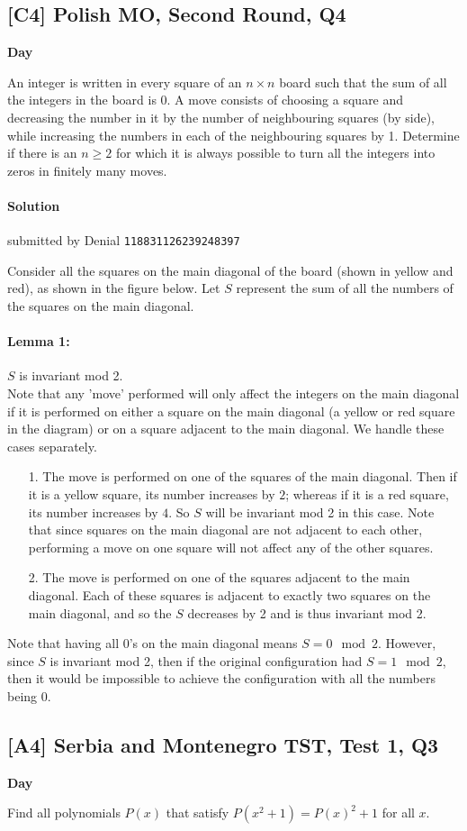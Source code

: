 \documentclass[10pt]{article}
\newcommand{\themonth}{March}
\newcommand{\theyear}{2019}
\newcounter{day}
\newcounter{solution}
\newcounter{datenumber}
\newcommand{\problem}[4][0]{
	\newpage
	\subsection{[#3] \space #2} \hfill 
	{\large\textbf{Day \arabic{day}}} %
	\begin{flushleft} #4 \end{flushleft}
	\vspace{1em}
	\addtocounter{day}{1}
	\addtocounter{datenumber}{1}
	\setcounter{solution}{1}
}
\newcommand{\solution}[4][0]{
	\paragraph{Solution \arabic{solution}} \hfill submitted by #2 \hfill \texttt{#3}
	\begin{flushleft} #4 \end{flushleft}
	\addtocounter{solution}{1}
	\vspace{1em}
}
\begin{document}
\problem[30]{2008 Polish MO, Second Round, Q4}{C4}{An integer is written in every square of an $n \times n$ board such that the sum of all the integers in the board is 0. A move consists of choosing a square and decreasing the number in it by the number of neighbouring squares (by side), while increasing the numbers in each of the neighbouring squares by 1. Determine if there is an $n \geq 2$ for which it is always possible to turn all the integers into zeros in finitely many moves.}

\solution[30]{Denial}{118831126239248397}{
Consider all the squares on the main diagonal of the board (shown in yellow and red), as shown in the figure below. Let $S$ represent the sum of all the numbers of the squares on the main diagonal. \\ 

\paragraph{Lemma 1: }$S$ is invariant mod 2. \\
Note that any 'move' performed will only affect the integers on the main diagonal if it is performed on either a square on the main diagonal (a yellow or red square in the diagram) or on a square adjacent to the main diagonal. We handle these cases separately. 
\begin{enumerate}
	\item[1. ]The move is performed on one of the squares of the main diagonal. Then if it is a yellow square, its number increases by $2$; whereas if it is a red square, its number increases by $4$. So $S$ will be invariant mod 2 in this case. Note that since squares on the main diagonal are not adjacent to each other, performing a move on one square will not affect any of the other squares. 
	\item[2. ]The move is performed on one of the squares adjacent to the main diagonal. Each of these squares is adjacent to exactly two squares on the main diagonal, and so the $S$ decreases by 2 and is thus invariant mod 2. 
\end{enumerate}
Note that having all 0's on the main diagonal means $S = 0 \mod 2$. However, since $S$ is invariant mod 2, then if the original configuration had $S = 1 \mod 2$, then it would be impossible to achieve the configuration with all the numbers being $0$. 
}

\problem[31]{2005 Serbia and Montenegro TST, Test 1, Q3}{A4}{Find all polynomials $P\left(x\right)$ that satisfy $P\left(x^2+1\right) = P\left(x\right)^2 + 1$ for all $x$.}
\end{document}
